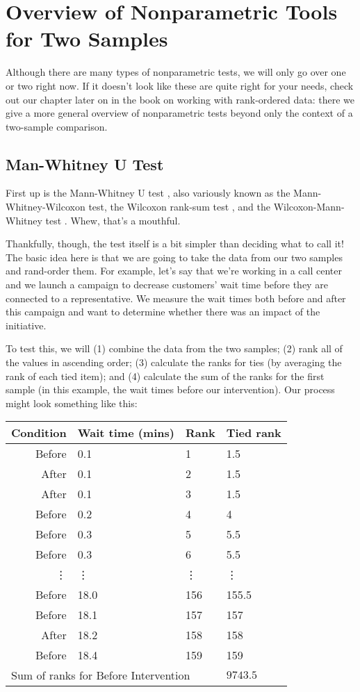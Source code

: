 \section{Overview of Nonparametric Tools for Two Samples}

Although there are many types of nonparametric tests, we will only go over one or two right now. If it doesn't look like these are quite right for your needs, check out our chapter later on in the book on working with rank-ordered data: there we give a more general overview of nonparametric tests beyond only the context of a two-sample comparison.

\subsection{Man-Whitney U Test}

First up is the Mann-Whitney U test , also variously known as the Mann-Whitney-Wilcoxon  test, the Wilcoxon rank-sum test , and the Wilcoxon-Mann-Whitney test . Whew, that's a mouthful.

Thankfully, though, the test itself is a bit simpler than deciding what to call it! The basic idea here is that we are going to take the data from our two samples and rand-order them. For example, let's say that we're working in a call center and we launch a campaign to decrease customers' wait time before they are connected to a representative. We measure the wait times both before and after this campaign and want to determine whether there was an impact of the initiative.

To test this, we will (1) combine the data from the two samples; (2) rank all of the values in ascending order; (3) calculate the ranks for ties (by averaging the rank of each tied item); and (4) calculate the sum of the ranks for the first sample (in this example, the wait times before our intervention). Our process might look something like this:\\[0.4cm]

\begin{tabular}{r | l l l}
Condition & Wait time (mins) & Rank & Tied rank \\
\hline
Before & 0.1 & 1 & 1.5 \\
After & 0.1 & 2 & 1.5 \\
After & 0.1 & 3 & 1.5 \\
Before & 0.2 & 4 & 4 \\
Before & 0.3 & 5 & 5.5 \\
Before & 0.3 & 6 & 5.5 \\
\vdots & \vdots & \vdots & \vdots \\
Before & 18.0 & 156 & 155.5 \\
Before & 18.1 & 157 & 157 \\
After & 18.2 & 158 & 158 \\
Before & 18.4 & 159 & 159 \\
\hline
\multicolumn{3}{l}{Sum of ranks for Before Intervention} & $9743.5$ \\
\end{tabular}\\[0.4cm]

